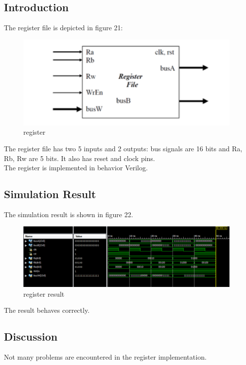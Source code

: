\documentclass{article}
\begin{document}
\subsection{Introduction}
The register file is depicted in figure 21: \\
\begin{figure}[!htb]
  \centering
  \includegraphics[width=\linewidth]{reg.png}
  \caption{register}
  \label{fig:reg}
\end{figure}
The register file has two 5 inputs and 2 outputs: bus signals are 16 bits and Ra, Rb, Rw are 5 bits. It also has reset and clock pins. \\
The register is implemented in behavior Verilog. 
\subsection{Simulation Result}
The simulation result is shown in figure 22. 
\begin{figure}[!htb]
  \centering
  \includegraphics[width=\linewidth]{lab1-3.PNG}
  \caption{register result}
  \label{fig:reg_res}
\end{figure}
The result behaves correctly.
\subsection{Discussion}
Not many problems are encountered in the register implementation. 
\end{document}
